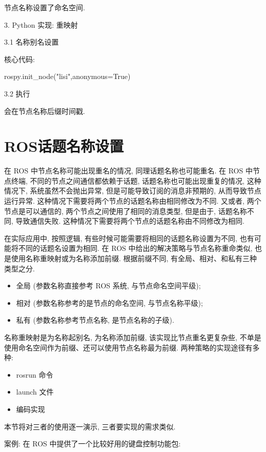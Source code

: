 \documentclass[openany, fontset=windowsold]{ctexbook}
\theoremstyle{kaiti}
\theoremstyle{normal}
\begin{document}
节点名称设置了命名空间.

3. Python 实现: 重映射

3.1 名称别名设置

核心代码: 

\begin{python}
  rospy.init_node("lisi",anonymous=True)
\end{python}

3.2 执行

会在节点名称后缀时间戳.

\section{ROS话题名称设置}

在 ROS 中节点名称可能出现重名的情况, 同理话题名称也可能重名. 在 ROS 中节点终端, 不同的节点之间通信都依赖于话题, 话题名称也可能出现重复的情况, 这种情况下, 系统虽然不会抛出异常, 但是可能导致订阅的消息非预期的, 从而导致节点运行异常. 这种情况下需要将两个节点的话题名称由相同修改为不同. 又或者, 两个节点是可以通信的, 两个节点之间使用了相同的消息类型, 但是由于, 话题名称不同, 导致通信失败. 这种情况下需要将两个节点的话题名称由不同修改为相同.

在实际应用中, 按照逻辑, 有些时候可能需要将相同的话题名称设置为不同, 也有可能将不同的话题名设置为相同. 在 ROS 中给出的解决策略与节点名称重命类似, 也是使用名称重映射或为名称添加前缀. 根据前缀不同, 有全局、相对、和私有三种类型之分.

\begin{itemize}
  \item 全局 (参数名称直接参考 ROS 系统, 与节点命名空间平级);
  \item 相对 (参数名称参考的是节点的命名空间, 与节点名称平级);
  \item 私有 (参数名称参考节点名称, 是节点名称的子级).
\end{itemize}

名称重映射是为名称起别名, 为名称添加前缀, 该实现比节点重名更复杂些, 不单是使用命名空间作为前缀、还可以使用节点名称最为前缀. 两种策略的实现途径有多种:

\begin{itemize}
  \item rosrun 命令
  \item launch 文件
  \item 编码实现
\end{itemize}

本节将对三者的使用逐一演示, 三者要实现的需求类似.

案例: 在 ROS 中提供了一个比较好用的键盘控制功能包:
\end{document}
